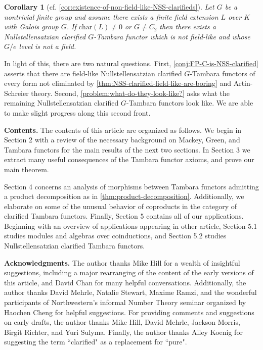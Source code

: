 \documentclass[11pt,dvipsnames]{amsart}
\newtheorem{corollaryLET}[theoremLET]{Corollary}
\theoremstyle{BoldRemark}
\begin{document}
\begin{corollaryLET}[cf. \cref{cor:existence-of-non-field-like-NSS-clarifieds}]
	Let $G$ be a nontrivial finite group and assume there exists a finite field extension $L$ over $K$ with Galois group $G$. If $\mathrm{char}(L) \neq 0$ or $G \neq C_2$ then there exists a Nullstellensatzian clarified $G$-Tambara functor which is not field-like and whose $G/e$ level is not a field.
\end{corollaryLET}

In light of this, there are two natural questions. First, \cref{conj:FP-C-is-NSS-clarified} asserts that there are field-like Nullstellensatzian clarified $G$-Tambara functors of every form not eliminated by \cref{thm:NSS-clarified-field-like-are-boring} and Artin-Schreier theory. Second, \cref{problem:what-do-they-look-like?} asks what the remaining Nullstellensatzian clarified $G$-Tambara functors look like. We are able to make slight progress along this second front.

\vspace{3mm}

\noindent \textbf{Contents.} The contents of this article are organized as follows. We begin in Section 2 with a review of the necessary background on Mackey, Green, and Tambara functors for the main results of the next two sections. In Section 3 we extract many useful consequences of the Tambara functor axioms, and prove our main theorem.

Section 4 concerns an analysis of morphisms between Tambara functors admitting a product decomposition as in \cref{thm:product-decomposition}. Additionally, we elaborate on some of the unusual behavior of coproducts in the category of clarified Tambara functors. Finally, Section 5 contains all of our applications. Beginning with an overview of applications appearing in other article, Section 5.1 studies modules and algebras over coinductions, and Section 5.2 studies Nullstellensatzian clarified Tambara functors.

\vspace{3mm}

\noindent \textbf{Acknowledgments.} The author thanks Mike Hill for a wealth of insightful suggestions, including a major rearranging of the content of the early versions of this article, and David Chan for many helpful conversations. Additionally, the author thanks David Mehrle, Natalie Stewart, Maxime Ramzi, and the wonderful participants of Northwestern's informal Number Theory seminar organized by Haochen Cheng for helpful suggestions. For providing comments and suggestions on early drafts, the author thanks Mike Hill, David Mehrle, Jackson Morris, Birgit Richter, and Yuri Sulyma. Finally, the author thanks Alley Koenig for suggesting the term ``clarified" as a replacement for ``pure".
\end{document}
